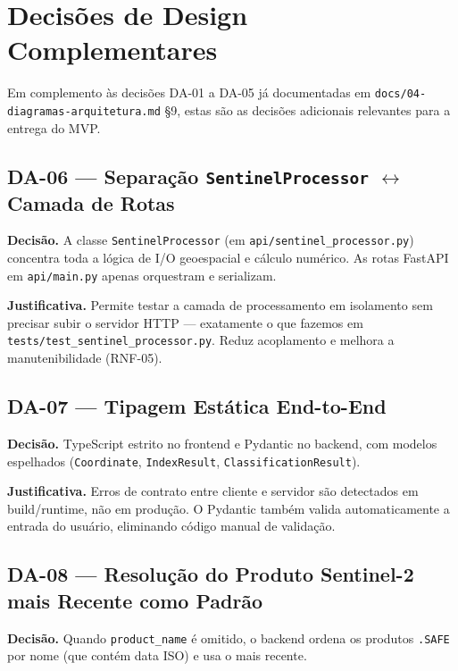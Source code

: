 \documentclass[11pt, a4paper]{article}
\begin{document}
\section{Decisões de Design Complementares}
\label{sec:decisoes}

Em complemento às decisões DA-01 a DA-05 já documentadas em \texttt{docs/04-diagramas-arquitetura.md} \S 9, estas são as decisões adicionais relevantes para a entrega do MVP.

\subsection*{DA-06 --- Separação \texttt{SentinelProcessor} \(\leftrightarrow\) Camada de Rotas}

\textbf{Decisão.} A classe \texttt{SentinelProcessor} (em \texttt{api/sentinel\_processor.py}) concentra toda a lógica de I/O geoespacial e cálculo numérico. As rotas FastAPI em \texttt{api/main.py} apenas orquestram e serializam.

\textbf{Justificativa.} Permite testar a camada de processamento em isolamento sem precisar subir o servidor HTTP --- exatamente o que fazemos em \texttt{tests/test\_sentinel\_processor.py}. Reduz acoplamento e melhora a manutenibilidade (RNF-05).

\subsection*{DA-07 --- Tipagem Estática End-to-End}

\textbf{Decisão.} TypeScript estrito no frontend e Pydantic no backend, com modelos espelhados (\texttt{Coordinate}, \texttt{IndexResult}, \texttt{ClassificationResult}).

\textbf{Justificativa.} Erros de contrato entre cliente e servidor são detectados em build/runtime, não em produção. O Pydantic também valida automaticamente a entrada do usuário, eliminando código manual de validação.

\subsection*{DA-08 --- Resolução do Produto Sentinel-2 mais Recente como Padrão}

\textbf{Decisão.} Quando \texttt{product\_name} é omitido, o backend ordena os produtos \texttt{.SAFE} por nome (que contém data ISO) e usa o mais recente.
\end{document}
